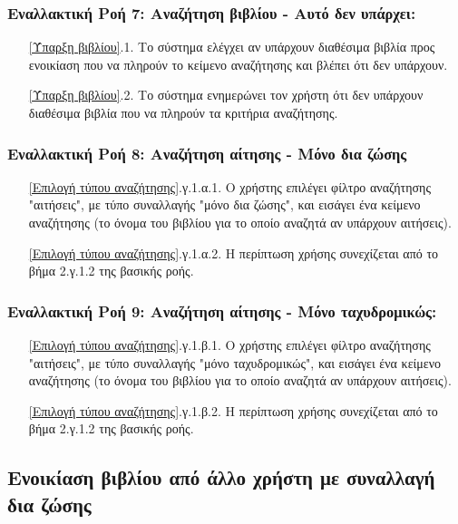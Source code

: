 \documentclass[12pt,a4paper]{article}
\begin{document}
\subsubsection*{Εναλλακτική Ροή 7: Αναζήτηση βιβλίου - Αυτό δεν υπάρχει:}
\begin{enumerate}
    \item[\ref{Ύπαρξη βιβλίου}.1.] Το σύστημα ελέγχει αν υπάρχουν διαθέσιμα βιβλία προς ενοικίαση που να πληρούν το κείμενο αναζήτησης και βλέπει ότι δεν υπάρχουν.
    \item[\ref{Ύπαρξη βιβλίου}.2.] Το σύστημα ενημερώνει τον χρήστη ότι δεν υπάρχουν διαθέσιμα βιβλία που να πληρούν τα κριτήρια αναζήτησης. 
\end{enumerate}

\subsubsection*{Εναλλακτική Ροή 8: Αναζήτηση αίτησης - Μόνο δια ζώσης}
\begin{enumerate}
    \item[\ref{Επιλογή τύπου αναζήτησης}.γ.1.α.1.] Ο χρήστης επιλέγει φίλτρο αναζήτησης "αιτήσεις", με τύπο συναλλαγής "μόνο δια ζώσης", και εισάγει ένα κείμενο αναζήτησης (το όνομα του βιβλίου για το οποίο αναζητά αν υπάρχουν αιτήσεις).
    \item[\ref{Επιλογή τύπου αναζήτησης}.γ.1.α.2.] Η περίπτωση χρήσης συνεχίζεται από το βήμα 2.γ.1.2 της βασικής ροής.
\end{enumerate}

\subsubsection*{Εναλλακτική Ροή 9: Αναζήτηση αίτησης - Μόνο ταχυδρομικώς:}
\begin{enumerate}
    \item[\ref{Επιλογή τύπου αναζήτησης}.γ.1.β.1.] Ο χρήστης επιλέγει φίλτρο αναζήτησης "αιτήσεις", με τύπο συναλλαγής "μόνο ταχυδρομικώς", και εισάγει ένα κείμενο αναζήτησης (το όνομα του βιβλίου για το οποίο αναζητά αν υπάρχουν αιτήσεις).
    \item[\ref{Επιλογή τύπου αναζήτησης}.γ.1.β.2.] Η περίπτωση χρήσης συνεχίζεται από το βήμα 2.γ.1.2 της βασικής ροής.
\end{enumerate}


\subsection{Ενοικίαση βιβλίου από άλλο χρήστη με συναλλαγή δια ζώσης}
\label{Rental Use Case}
\end{document}
